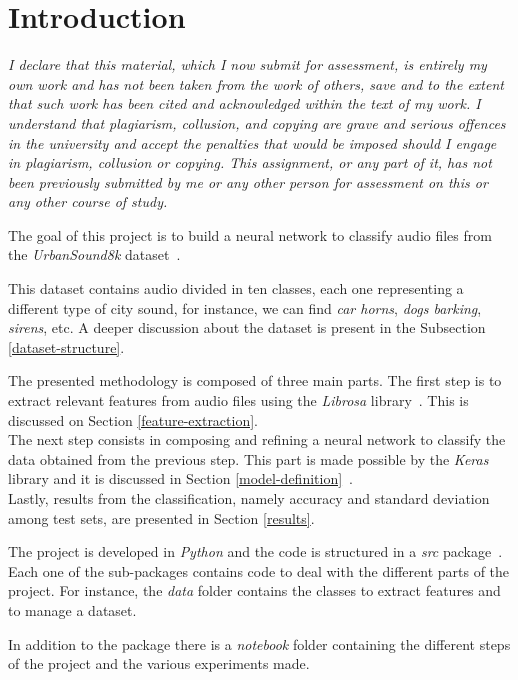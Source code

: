 \section{Introduction}

\emph{I declare that this material, which I now submit for assessment, 
is entirely my own work and has not been taken from the work of others, 
save and to the extent that such work has been cited and acknowledged within 
the text of my work. I understand that plagiarism, collusion, and copying 
are grave and serious offences in the university and accept the penalties that 
would be imposed should I engage in plagiarism, collusion or copying. 
This assignment, or any part of it, has not been previously submitted by 
me or any other person for assessment on this or any other course of study.}

The goal of this project is to build a neural network to classify audio 
files from the \emph{UrbanSound8k} dataset~\cite{dataset}.

This dataset contains audio divided in ten classes, each one representing 
a different type of city sound, for instance, we can find \emph{car horns}, 
\emph{dogs barking}, \emph{sirens}, etc. A deeper discussion about 
the dataset is present in the Subsection \vref*{dataset-structure}.

The presented methodology is composed of three main parts.
The first step is to extract relevant features from audio files using the
\emph{Librosa} library~\cite{librosa}.  This is discussed on Section 
\vref*{feature-extraction}.\\
The next step consists in composing and refining a neural network 
to classify the data obtained from the previous step. This part is 
made possible by the \emph{Keras} library and it is discussed in 
Section \vref*{model-definition}~\cite{keras}.\\
Lastly, results from the classification, namely accuracy 
and standard deviation among test sets, are presented in 
Section \vref*{results}.

The project is developed in \emph{Python} and the code is structured in 
a \emph{src} package~\cite{python}. Each one of the sub-packages contains code to deal 
with the different parts of the project. For instance, the \emph{data} folder 
contains the classes to extract features and to manage a dataset.

In addition to the package there is a \emph{notebook} folder containing
the different steps of the project and the various experiments made.

\newpage